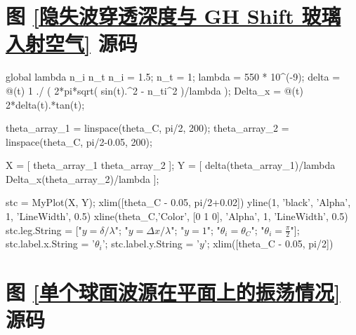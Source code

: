 \documentclass[UTF8]{report}
\theoremstyle{MyLineTheoremStyle} %
\theoremstyle{MyBlockTheoremStyle} %
\theoremstyle{MySubsubsectionStyle} %
\begin{document}
\section{图 \ref{隐失波穿透深度与 GH Shift 玻璃入射空气} 源码}
\label{隐失波穿透深度与 GH Shift 玻璃入射空气 源码}
\begin{matlablisting}
global lambda n_i n_t
n_i = 1.5;
n_t = 1;
lambda = 550 * 10^(-9);     %
delta = @(t) 1 ./ ( 2*pi*sqrt( sin(t).^2 - n_ti^2 )/lambda );
Delta_x = @(t) 2*delta(t).*tan(t);

theta_array_1 = linspace(theta_C, pi/2, 200);
theta_array_2 = linspace(theta_C, pi/2-0.05, 200);


X = [
    theta_array_1
    theta_array_2
];
Y = [
    delta(theta_array_1)/lambda
    Delta_x(theta_array_2)/lambda
];

stc = MyPlot(X, Y);
xlim([theta_C - 0.05, pi/2+0.02])
yline(1, 'black', 'Alpha', 1, 'LineWidth', 0.5)
xline(theta_C,'Color', [0 1 0], 'Alpha', 1, 'LineWidth', 0.5)
stc.leg.String = ["$y = \delta / \lambda$"; "$y = \Delta x / \lambda$"; "$y = 1$"; "$\theta_i = \theta_C$"; "$\theta_i = \frac{\pi}{2}$"];
stc.label.x.String = '$\theta_i$';
stc.label.y.String = '$y$';
xlim([theta_C - 0.05, pi/2])

\end{matlablisting}

\section{图 \ref{单个球面波源在平面上的振荡情况} 源码}
\label{单个球面波源在平面上的振荡情况 源码}
\end{document}
